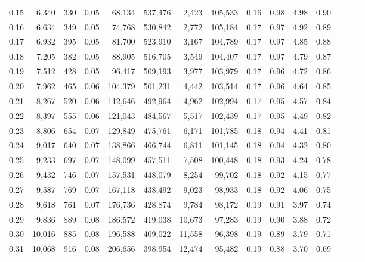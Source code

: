 \begin{tabular}{rrrrrrrrrrrrrrr}
0.15 &   6,340 &    330 &  0.05 &   68,134 &  537,476 &    2,423 &  105,533 &  0.16 &  0.98 &  4.98 &      0.90 \\
0.16 &   6,634 &    349 &  0.05 &   74,768 &  530,842 &    2,772 &  105,184 &  0.17 &  0.97 &  4.92 &      0.89 \\
0.17 &   6,932 &    395 &  0.05 &   81,700 &  523,910 &    3,167 &  104,789 &  0.17 &  0.97 &  4.85 &      0.88 \\
0.18 &   7,205 &    382 &  0.05 &   88,905 &  516,705 &    3,549 &  104,407 &  0.17 &  0.97 &  4.79 &      0.87 \\
0.19 &   7,512 &    428 &  0.05 &   96,417 &  509,193 &    3,977 &  103,979 &  0.17 &  0.96 &  4.72 &      0.86 \\
0.20 &   7,962 &    465 &  0.06 &  104,379 &  501,231 &    4,442 &  103,514 &  0.17 &  0.96 &  4.64 &      0.85 \\
0.21 &   8,267 &    520 &  0.06 &  112,646 &  492,964 &    4,962 &  102,994 &  0.17 &  0.95 &  4.57 &      0.84 \\
0.22 &   8,397 &    555 &  0.06 &  121,043 &  484,567 &    5,517 &  102,439 &  0.17 &  0.95 &  4.49 &      0.82 \\
0.23 &   8,806 &    654 &  0.07 &  129,849 &  475,761 &    6,171 &  101,785 &  0.18 &  0.94 &  4.41 &      0.81 \\
0.24 &   9,017 &    640 &  0.07 &  138,866 &  466,744 &    6,811 &  101,145 &  0.18 &  0.94 &  4.32 &      0.80 \\
0.25 &   9,233 &    697 &  0.07 &  148,099 &  457,511 &    7,508 &  100,448 &  0.18 &  0.93 &  4.24 &      0.78 \\
0.26 &   9,432 &    746 &  0.07 &  157,531 &  448,079 &    8,254 &   99,702 &  0.18 &  0.92 &  4.15 &      0.77 \\
0.27 &   9,587 &    769 &  0.07 &  167,118 &  438,492 &    9,023 &   98,933 &  0.18 &  0.92 &  4.06 &      0.75 \\
0.28 &   9,618 &    761 &  0.07 &  176,736 &  428,874 &    9,784 &   98,172 &  0.19 &  0.91 &  3.97 &      0.74 \\
0.29 &   9,836 &    889 &  0.08 &  186,572 &  419,038 &   10,673 &   97,283 &  0.19 &  0.90 &  3.88 &      0.72 \\
0.30 &  10,016 &    885 &  0.08 &  196,588 &  409,022 &   11,558 &   96,398 &  0.19 &  0.89 &  3.79 &      0.71 \\
0.31 &  10,068 &    916 &  0.08 &  206,656 &  398,954 &   12,474 &   95,482 &  0.19 &  0.88 &  3.70 &      0.69 \\

\end{tabular}
